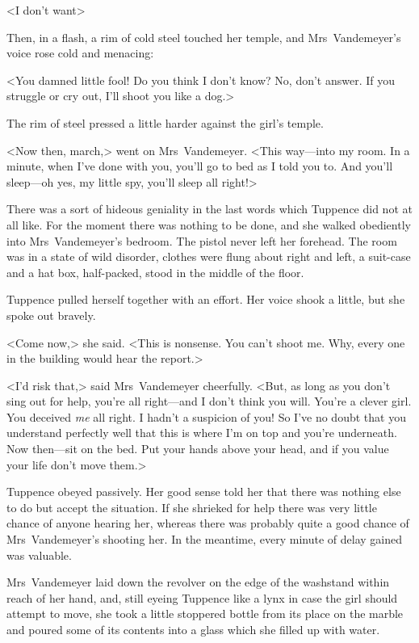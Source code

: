 <I don't want\longdash>

Then, in a flash, a rim of cold steel touched her temple, and Mrs~Vandemeyer's voice rose cold and menacing:

<You damned little fool! Do you think I don't know? No, don't answer. If you struggle or cry out, I'll shoot you like a dog.>

The rim of steel pressed a little harder against the girl's temple.

<Now then, march,> went on Mrs~Vandemeyer. <This way—into my room. In a minute, when I've done with you, you'll go to bed as I told you to. And you'll sleep—oh yes, my little spy, you'll sleep all right!>

There was a sort of hideous geniality in the last words which Tuppence did not at all like. For the moment there was nothing to be done, and she walked obediently into Mrs~Vandemeyer's bedroom. The pistol never left her forehead. The room was in a state of wild disorder, clothes were flung about right and left, a suit-case and a hat box, half-packed, stood in the middle of the floor.

Tuppence pulled herself together with an effort. Her voice shook a little, but she spoke out bravely.

<Come now,> she said. <This is nonsense. You can't shoot me. Why, every one in the building would hear the report.>

<I'd risk that,> said Mrs~Vandemeyer cheerfully. <But, as long as you don't sing out for help, you're all right—and I don't think you will. You're a clever girl. You deceived \emph{me} all right. I hadn't a suspicion of you! So I've no doubt that you understand perfectly well that this is where I'm on top and you're underneath. Now then—sit on the bed. Put your hands above your head, and if you value your life don't move them.>

Tuppence obeyed passively. Her good sense told her that there was nothing else to do but accept the situation. If she shrieked for help there was very little chance of anyone hearing her, whereas there was probably quite a good chance of Mrs~Vandemeyer's shooting her. In the meantime, every minute of delay gained was valuable.

Mrs~Vandemeyer laid down the revolver on the edge of the washstand within reach of her hand, and, still eyeing Tuppence like a lynx in case the girl should attempt to move, she took a little stoppered bottle from its place on the marble and poured some of its contents into a glass which she filled up with water.


